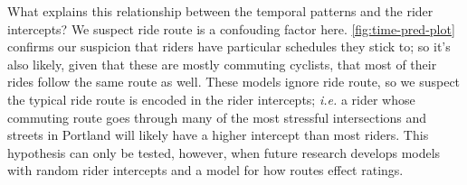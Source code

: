 \documentclass[]{article}
\begin{document}
What explains this relationship between the temporal patterns and the
rider intercepts? We suspect ride route is a confouding factor here.
\autoref{fig:time-pred-plot} confirms our suspicion that riders have
particular schedules they stick to; so it's also likely, given that
these are mostly commuting cyclists, that most of their rides follow the
same route as well. These models ignore ride route, so we suspect the
typical ride route is encoded in the rider intercepts; \emph{i.e.} a
rider whose commuting route goes through many of the most stressful
intersections and streets in Portland will likely have a higher
intercept than most riders. This hypothesis can only be tested, however,
when future research develops models with random rider intercepts and a
model for how routes effect ratings.
\end{document}
